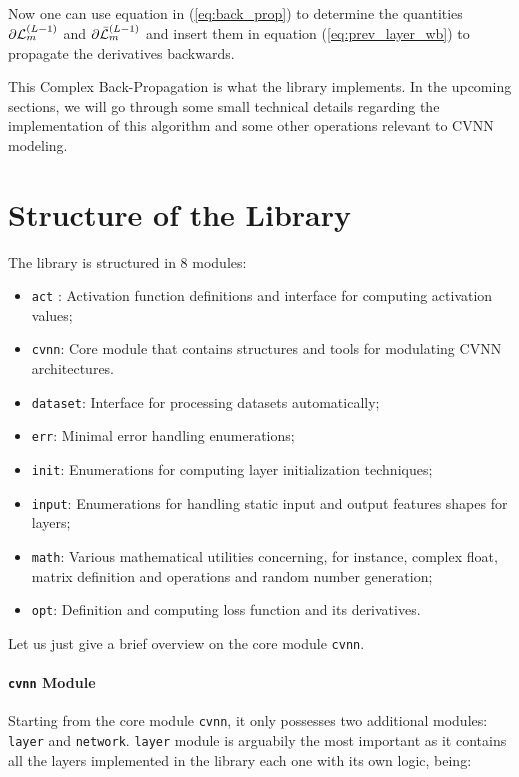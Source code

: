 Now one can use equation in (\ref{eq:back_prop}) to determine the quantities $ \partial\mathcal{L}^{(L-1)}_{m} $ and $ \partial\bar{\mathcal{L}}^{(L-1)}_{m} $ and insert them in equation (\ref{eq:prev_layer_wb}) to propagate the derivatives backwards.

This Complex Back-Propagation is what the library implements. In the upcoming sections, we will go through some small technical details regarding the implementation of this algorithm and some other operations relevant to \gls{CVNN} modeling.

\section{Structure of the Library}

The library is structured in 8 modules:

\begin{itemize}
	\item \texttt{act} : Activation function definitions and interface for computing activation values;
	\item \texttt{cvnn}: Core module that contains structures and tools for modulating \gls{CVNN} architectures.
	\item \texttt{dataset}: Interface for processing datasets automatically;
	\item \texttt{err}: Minimal error handling enumerations;
	\item \texttt{init}: Enumerations for computing layer initialization techniques;
	\item \texttt{input}: Enumerations for handling static input and output features shapes for layers;
	\item \texttt{math}: Various mathematical utilities concerning, for instance, complex float, matrix definition and operations and random number generation;
	\item \texttt{opt}: Definition and computing loss function and its derivatives.
\end{itemize}

Let us just give a brief overview on the core module \texttt{cvnn}.

\paragraph{\texttt{cvnn} Module}
Starting from the core module \texttt{cvnn}, it only possesses two additional modules: \texttt{layer} and \texttt{network}. \texttt{layer} module is arguabily the most important as it contains all the layers implemented in the library each one with its own logic, being:

